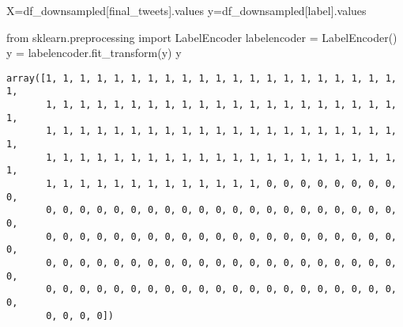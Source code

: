 \documentclass[
  letterpaper,
  DIV=11,
  numbers=noendperiod]{scrartcl}
\newenvironment{Shaded}{\begin{snugshade}}{\end{snugshade}}
\newcommand{\ImportTok}[1]{\textcolor[rgb]{0.00,0.46,0.62}{#1}}
\newcommand{\NormalTok}[1]{\textcolor[rgb]{0.00,0.23,0.31}{#1}}
\newcommand{\OperatorTok}[1]{\textcolor[rgb]{0.37,0.37,0.37}{#1}}
\newcommand{\StringTok}[1]{\textcolor[rgb]{0.13,0.47,0.30}{#1}}
\begin{document}
\begin{Shaded}
\begin{Highlighting}[]
\NormalTok{X}\OperatorTok{=}\NormalTok{df\_downsampled[}\StringTok{\textquotesingle{}final\_tweets\textquotesingle{}}\NormalTok{].values}
\NormalTok{y}\OperatorTok{=}\NormalTok{df\_downsampled[}\StringTok{\textquotesingle{}label\textquotesingle{}}\NormalTok{].values}
\end{Highlighting}
\end{Shaded}

\begin{Shaded}
\begin{Highlighting}[]
\ImportTok{from}\NormalTok{ sklearn.preprocessing }\ImportTok{import}\NormalTok{ LabelEncoder}
\NormalTok{labelencoder }\OperatorTok{=}\NormalTok{ LabelEncoder()}
\NormalTok{y }\OperatorTok{=}\NormalTok{ labelencoder.fit\_transform(y)}
\NormalTok{y}
\end{Highlighting}
\end{Shaded}

\begin{verbatim}
array([1, 1, 1, 1, 1, 1, 1, 1, 1, 1, 1, 1, 1, 1, 1, 1, 1, 1, 1, 1, 1, 1,
       1, 1, 1, 1, 1, 1, 1, 1, 1, 1, 1, 1, 1, 1, 1, 1, 1, 1, 1, 1, 1, 1,
       1, 1, 1, 1, 1, 1, 1, 1, 1, 1, 1, 1, 1, 1, 1, 1, 1, 1, 1, 1, 1, 1,
       1, 1, 1, 1, 1, 1, 1, 1, 1, 1, 1, 1, 1, 1, 1, 1, 1, 1, 1, 1, 1, 1,
       1, 1, 1, 1, 1, 1, 1, 1, 1, 1, 1, 1, 1, 0, 0, 0, 0, 0, 0, 0, 0, 0,
       0, 0, 0, 0, 0, 0, 0, 0, 0, 0, 0, 0, 0, 0, 0, 0, 0, 0, 0, 0, 0, 0,
       0, 0, 0, 0, 0, 0, 0, 0, 0, 0, 0, 0, 0, 0, 0, 0, 0, 0, 0, 0, 0, 0,
       0, 0, 0, 0, 0, 0, 0, 0, 0, 0, 0, 0, 0, 0, 0, 0, 0, 0, 0, 0, 0, 0,
       0, 0, 0, 0, 0, 0, 0, 0, 0, 0, 0, 0, 0, 0, 0, 0, 0, 0, 0, 0, 0, 0,
       0, 0, 0, 0])
\end{verbatim}
\end{document}
